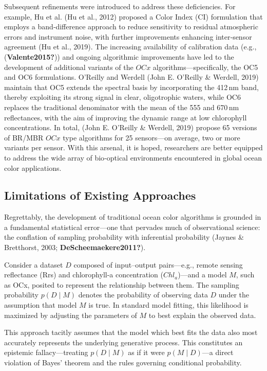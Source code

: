 \documentclass[
]{agujournal2019}
\begin{document}
Subsequent refinements were introduced to address these deficiencies.
For example, Hu et al. (Hu et al., 2012) proposed a Color Index (CI)
formulation that employs a band‑difference approach to reduce
sensitivity to residual atmospheric errors and instrument noise, with
further improvements enhancing inter‑sensor agreement (Hu et al., 2019).
The increasing availability of calibration data (e.g.,
(\textbf{Valente2015?})) and ongoing algorithmic improvements have led
to the development of additional variants of the \(OCx\)
algorithms---specifically, the OC5 and OC6 formulations. O'Reilly and
Werdell (John E. O'Reilly \& Werdell, 2019) maintain that OC5 extends
the spectral basis by incorporating the 412\,nm band, thereby exploiting
its strong signal in clear, oligotrophic waters, while OC6 replaces the
traditional denominator with the mean of the 555 and 670\,nm
reflectances, with the aim of improving the dynamic range at low
chlorophyll concentrations. In total, (John E. O'Reilly \& Werdell,
2019) propose 65 versions of BR/MBR \(OCx\) type algorithms for 25
sensors---on average, two or more variants per sensor. With this
arsenal, it is hoped, researchers are better equipped to address the
wide array of bio‑optical environments encountered in global ocean color
applications.

\subsection{Limitations of Existing
Approaches}\label{limitations-of-existing-approaches}

Regrettably, the development of traditional ocean color algorithms is
grounded in a fundamental statistical error---one that pervades much of
observational science: the conflation of sampling probability with
inferential probability (Jaynes \& Bretthorst, 2003;
\textbf{DeScheemaekere2011?}).

Consider a dataset \(D\) composed of input--output pairs---e.g., remote
sensing reflectance (Rrs) and chlorophyll-a concentration
(\(Chl_a\))---and a model \(M\), such as OCx, posited to represent the
relationship between them. The sampling probability \(p(D \mid M)\)
denotes the probability of observing data \(D\) under the assumption
that model \(M\) is true. In standard model fitting, this likelihood is
maximized by adjusting the parameters of \(M\) to best explain the
observed data.

This approach tacitly assumes that the model which best fits the data
also most accurately represents the underlying generative process. This
constitutes an epistemic fallacy---treating \(p(D \mid M)\) as if it
were \(p(M \mid D)\)---a direct violation of Bayes' theorem and the
rules governing conditional probability.
\end{document}
